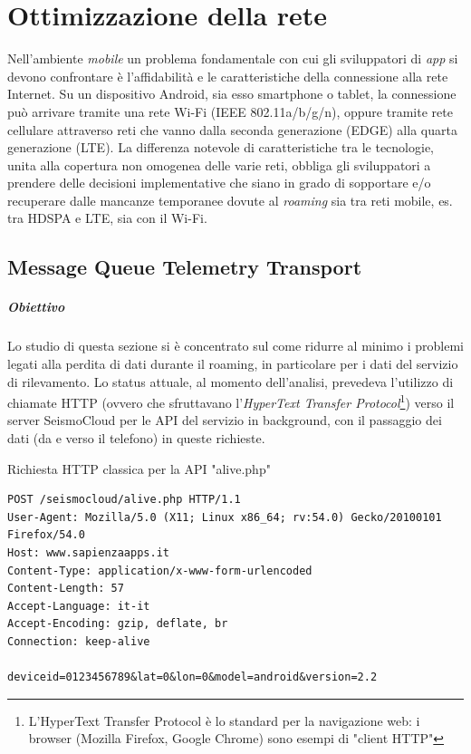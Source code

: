 \documentclass[a4paper,10pt]{memoir}
\begin{document}
\chapter{Ottimizzazione della rete}

Nell'ambiente \textit{mobile} un problema fondamentale con cui gli sviluppatori di \textit{app} si devono confrontare è l'affidabilità e le caratteristiche della connessione alla rete Internet. Su un dispositivo Android, sia esso smartphone o tablet, la connessione può arrivare tramite una rete Wi-Fi (IEEE 802.11a/b/g/n), oppure tramite rete cellulare attraverso reti che vanno dalla seconda generazione (EDGE) alla quarta generazione (LTE). La differenza notevole di caratteristiche tra le tecnologie, unita alla copertura non omogenea delle varie reti, obbliga gli sviluppatori a prendere delle decisioni implementative che siano in grado di sopportare e/o recuperare dalle mancanze temporanee dovute al \textit{roaming} sia tra reti mobile, es. tra HDSPA e LTE, sia con il Wi-Fi.

\section{Message Queue Telemetry Transport}
\label{section:mqtt}

\paragraph{Obiettivo} Lo studio di questa sezione si è concentrato sul come ridurre al minimo i problemi legati alla perdita di dati durante il roaming, in particolare per i dati del servizio di rilevamento. Lo status attuale, al momento dell'analisi, prevedeva l'utilizzo di chiamate HTTP (ovvero che sfruttavano l'\textit{HyperText Transfer Protocol}\footnote{L'HyperText Transfer Protocol è lo standard per la navigazione web: i browser (Mozilla Firefox, Google Chrome) sono esempi di "client HTTP"}) verso il server SeismoCloud per le API del servizio in background, con il passaggio dei dati (da e verso il telefono) in queste richieste.

\begin{listing}[H]
\caption{Richiesta HTTP classica per la API "alive.php"}
\label{listing:httpreq}
\begin{verbatim}
POST /seismocloud/alive.php HTTP/1.1
User-Agent: Mozilla/5.0 (X11; Linux x86_64; rv:54.0) Gecko/20100101 Firefox/54.0
Host: www.sapienzaapps.it
Content-Type: application/x-www-form-urlencoded
Content-Length: 57
Accept-Language: it-it
Accept-Encoding: gzip, deflate, br
Connection: keep-alive

deviceid=0123456789&lat=0&lon=0&model=android&version=2.2
\end{verbatim}
\end{listing}
\end{document}
